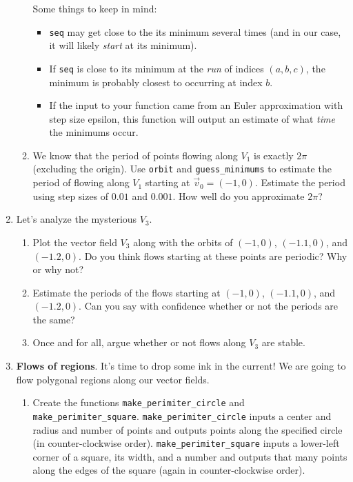 \documentclass[letter]{article}
\begin{document}
\begin{enumerate}
\begin{enumerate}
					Some things to keep in mind:
					\begin{itemize}
						\item {\tt seq} may get close to the its minimum several times (and in our case, it will likely
							\emph{start} at its minimum).
						\item If {\tt seq} is close to its minimum at the \emph{run} of indices $(a,b,c)$,
							the minimum is probably closest to occurring at index $b$.
						\item If the input to your function came from an Euler approximation with step size epsilon,
							this function will output an estimate of what \emph{time} the minimums occur.
					\end{itemize}
				\item We know that the period of points flowing along $V_1$ is exactly $2\pi$ (excluding the origin).
					Use {\tt orbit} and \verb|guess_minimums| to estimate the period of flowing along
					$V_1$ starting at $\vec v_0=(-1,0)$. Estimate the period using step sizes of $0.01$ and $0.001$.
					How well do you approximate $2\pi$?
			\end{enumerate}
		\item Let's analyze the mysterious $V_3$.
			\begin{enumerate}
				\item Plot the vector field $V_3$ along with the orbits of $(-1,0)$, $(-1.1,0)$, and $(-1.2,0)$. Do you
					think flows starting at these points are periodic? Why or why not?
				\item Estimate the periods of the flows starting at $(-1,0)$, $(-1.1,0)$, and $(-1.2,0)$. Can you say with
					confidence whether or not the periods are the same?
				\item Once and for all, argue whether or not flows along $V_3$ are stable.
			\end{enumerate}

		\item {\bf Flows of regions}. It's time to drop some ink in the current! We are going to flow polygonal regions along our vector
			fields.
			\begin{enumerate}
				\item Create the functions \verb|make_perimiter_circle| and \verb|make_perimiter_square|.
				\verb|make_perimiter_circle| inputs a center and radius and number of points and outputs points along
					the specified circle (in counter-clockwise order). \verb|make_perimiter_square| inputs a lower-left
					corner of a square, its width, and a number and outputs that many points along the edges of 
					the square (again in counter-clockwise order).


\end{enumerate}
\end{enumerate}
\end{document}
